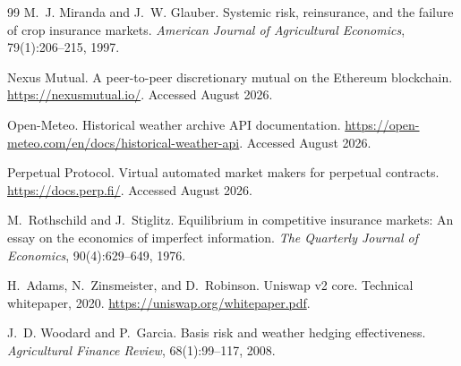 \documentclass[11pt,a4paper]{article}
\begin{document}
\begin{thebibliography}{99}
M.~J. Miranda and J.~W. Glauber.
\newblock Systemic risk, reinsurance, and the failure of crop insurance markets.
\newblock \emph{American Journal of Agricultural Economics}, 79(1):206--215, 1997.

Nexus Mutual.
\newblock A peer-to-peer discretionary mutual on the Ethereum blockchain.
\newblock \url{https://nexusmutual.io/}. Accessed August 2026.

Open-Meteo.
\newblock Historical weather archive API documentation.
\newblock \url{https://open-meteo.com/en/docs/historical-weather-api}. Accessed August 2026.

Perpetual Protocol.
\newblock Virtual automated market makers for perpetual contracts.
\newblock \url{https://docs.perp.fi/}. Accessed August 2026.

M.~Rothschild and J.~Stiglitz.
\newblock Equilibrium in competitive insurance markets: An essay on the economics of
imperfect information.
\newblock \emph{The Quarterly Journal of Economics}, 90(4):629--649, 1976.

H.~Adams, N.~Zinsmeister, and D.~Robinson.
\newblock Uniswap v2 core.
\newblock Technical whitepaper, 2020.
\newblock \url{https://uniswap.org/whitepaper.pdf}.

J.~D. Woodard and P.~Garcia.
\newblock Basis risk and weather hedging effectiveness.
\newblock \emph{Agricultural Finance Review}, 68(1):99--117, 2008.

\end{thebibliography}
\end{document}
